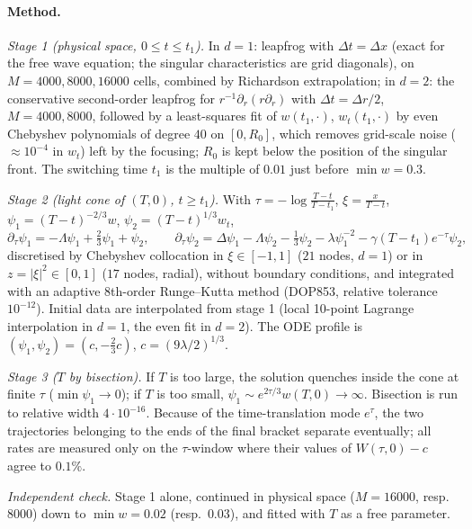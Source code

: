 \paragraph{Method.}
\emph{Stage 1 (physical space, $0\le t\le t_1$).} In $d=1$: leapfrog with
$\Delta t=\Delta x$ (exact for the free wave equation; the singular
characteristics are grid diagonals), on $M=4000,8000,16000$ cells, combined by
Richardson extrapolation; in $d=2$: the conservative second-order leapfrog for
$r^{-1}\partial_r(r\partial_r)$ with $\Delta t=\Delta r/2$, $M=4000,8000$, followed
by a least-squares fit of $w(t_1,\cdot)$, $w_t(t_1,\cdot)$ by even Chebyshev
polynomials of degree $40$ on $[0,R_0]$, which removes grid-scale noise
($\approx10^{-4}$ in $w_t$) left by the focusing; $R_0$ is kept below the
position of the singular front. The switching time $t_1$ is the multiple of
$0.01$ just before $\min w=0.3$.

\emph{Stage 2 (light cone of $(T,0)$, $t\ge t_1$).} With
$\tau=-\log\frac{T-t}{T-t_1}$, $\xi=\frac{x}{T-t}$, $\psi_1=(T-t)^{-2/3}w$,
$\psi_2=(T-t)^{1/3}w_t$,
\begin{equation}\label{num:simmems}
  \partial_\tau\psi_1=-\Lambda\psi_1+\tfrac23\psi_1+\psi_2,\qquad
  \partial_\tau\psi_2=\Delta\psi_1-\Lambda\psi_2-\tfrac13\psi_2-\lambda\psi_1^{-2}
  -\gamma(T-t_1)e^{-\tau}\psi_2 ,
\end{equation}
discretised by Chebyshev collocation in $\xi\in[-1,1]$ ($21$ nodes, $d=1$) or
in $z=|\xi|^2\in[0,1]$ ($17$ nodes, radial), without boundary conditions, and
integrated with an adaptive 8th-order Runge--Kutta method (DOP853, relative
tolerance $10^{-12}$). Initial data are interpolated from stage 1 (local
10-point Lagrange interpolation in $d=1$, the even fit in $d=2$). The ODE
profile is $(\psi_1,\psi_2)=(c,-\frac23c)$, $c=(9\lambda/2)^{1/3}$.

\emph{Stage 3 ($T$ by bisection).} If $T$ is too large, the solution quenches
inside the cone at finite $\tau$ ($\min\psi_1\to0$); if $T$ is too small,
$\psi_1\sim e^{2\tau/3}w(T,0)\to\infty$. Bisection is run to relative width
$4\cdot10^{-16}$. Because of the time-translation mode $e^{\tau}$, the two
trajectories belonging to the ends of the final bracket separate eventually;
all rates are measured only on the $\tau$-window where their values of
$W(\tau,0)-c$ agree to $0.1\%$.

\emph{Independent check.} Stage 1 alone, continued in physical space
($M=16000$, resp.\ $8000$) down to $\min w=0.02$ (resp.\ $0.03$), and fitted
with $T$ as a free parameter.

